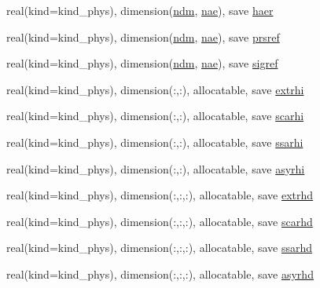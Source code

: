 \begin{DoxyCompactItemize}
\item 
real(kind=kind\+\_\+phys), dimension(\hyperlink{namespacemodule__radiation__aerosols_ae77b22f76f193cef19b6e6c3ee8e0773}{ndm}, \hyperlink{namespacemodule__radiation__aerosols_a45121ca4dcb3194e8afb4090fa810657}{nae}), save \hyperlink{namespacemodule__radiation__aerosols_a8ce24a58afb33dd372995bf5aaf95be9}{haer}
\item 
real(kind=kind\+\_\+phys), dimension(\hyperlink{namespacemodule__radiation__aerosols_ae77b22f76f193cef19b6e6c3ee8e0773}{ndm}, \hyperlink{namespacemodule__radiation__aerosols_a45121ca4dcb3194e8afb4090fa810657}{nae}), save \hyperlink{namespacemodule__radiation__aerosols_a274fad1b6e00e66375882e32494d61c0}{prsref}
\item 
real(kind=kind\+\_\+phys), dimension(\hyperlink{namespacemodule__radiation__aerosols_ae77b22f76f193cef19b6e6c3ee8e0773}{ndm}, \hyperlink{namespacemodule__radiation__aerosols_a45121ca4dcb3194e8afb4090fa810657}{nae}), save \hyperlink{namespacemodule__radiation__aerosols_a227ac7558dc0f33c34c34544771617ec}{sigref}
\item 
real(kind=kind\+\_\+phys), dimension(\+:,\+:), allocatable, save \hyperlink{namespacemodule__radiation__aerosols_a40447f925f01790155c4d98ff8b0c04d}{extrhi}
\item 
real(kind=kind\+\_\+phys), dimension(\+:,\+:), allocatable, save \hyperlink{namespacemodule__radiation__aerosols_a439929b1de549fadecc8537bae13e9de}{scarhi}
\item 
real(kind=kind\+\_\+phys), dimension(\+:,\+:), allocatable, save \hyperlink{namespacemodule__radiation__aerosols_ae4e1ead8bb34371c2d9f1b428846c10c}{ssarhi}
\item 
real(kind=kind\+\_\+phys), dimension(\+:,\+:), allocatable, save \hyperlink{namespacemodule__radiation__aerosols_aac2d735c117dd7d1e72264e611764f79}{asyrhi}
\item 
real(kind=kind\+\_\+phys), dimension(\+:,\+:,\+:), allocatable, save \hyperlink{namespacemodule__radiation__aerosols_a1c69f7b8ff0c98252e94def83dabfed4}{extrhd}
\item 
real(kind=kind\+\_\+phys), dimension(\+:,\+:,\+:), allocatable, save \hyperlink{namespacemodule__radiation__aerosols_a859ba893a7b0b727ce02f3f29906a0a6}{scarhd}
\item 
real(kind=kind\+\_\+phys), dimension(\+:,\+:,\+:), allocatable, save \hyperlink{namespacemodule__radiation__aerosols_ac0714d386ee3dc2ca7f6692905566274}{ssarhd}
\item 
real(kind=kind\+\_\+phys), dimension(\+:,\+:,\+:), allocatable, save \hyperlink{namespacemodule__radiation__aerosols_a090d37e62ba333db64e28bf89e89a08d}{asyrhd}

\end{DoxyCompactItemize}

